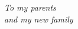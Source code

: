 
\thispagestyle{empty}

\begin{flushright}

{\LARGE \textit{To my parents}}\\
{\LARGE \textit{and my new family}}\\
  \vspace{30pt}

\end{flushright}


\clearpage